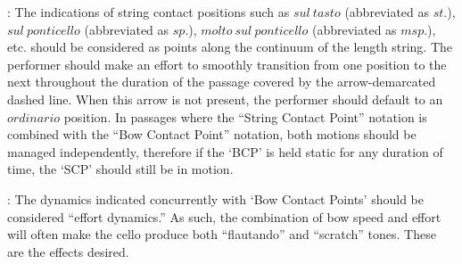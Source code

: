 \documentclass[10pt]{article}
\begin{document}
\vspace*{0.2\baselineskip}

\begingroup
\begin{center}
: The indications of string contact positions such as $sul \ tasto$ (abbreviated as $st.$), $sul \ ponticello$ (abbreviated as $sp.$), $molto \ sul \ ponticello$ (abbreviated as $msp.$), etc. should be considered as points along the continuum of the length string. The performer should make an effort to smoothly transition from one position to the next throughout the duration of the passage covered by the arrow-demarcated dashed line. When this arrow is not present, the performer should default to an $ordinario$ position. In passages where the ``String Contact Point'' notation is combined with the ``Bow Contact Point'' notation, both motions should be managed independently, therefore if the `BCP' is held static for any duration of time, the `SCP' should still be in motion.
\rightskip\leftskip
\phantom{text} \hfill \phantom{()}
\end{center}
\endgroup

\vspace*{0.2\baselineskip}

\begingroup
\begin{center}
: The dynamics indicated concurrently with `Bow Contact Points' should be considered ``effort dynamics.'' As such, the combination of bow speed and effort will often make the cello produce both ``flautando'' and ``scratch'' tones. These are the effects desired.
\rightskip\leftskip
\phantom{text} \hfill \phantom{()}
\end{center}
\endgroup

\vspace*{0.2\baselineskip}
\end{document}
